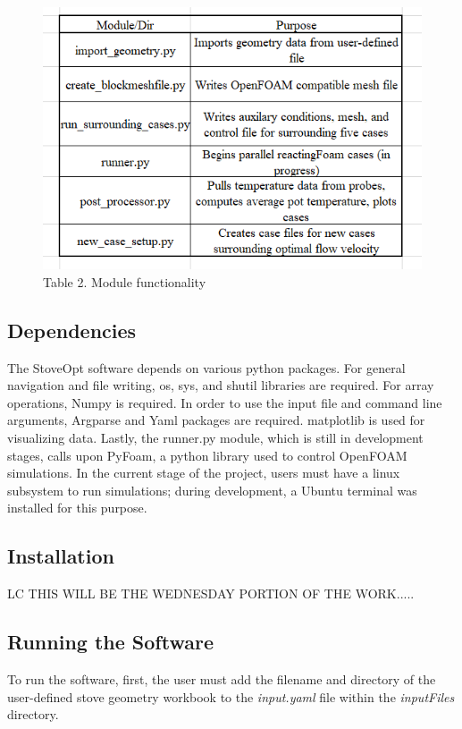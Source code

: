 \documentclass[3p,times,twocolumn]{elsarticle}
\begin{document}
\begin{figure}{\linewidth}
	\includegraphics[width=\linewidth]{functionality.PNG}
	\caption{Table 2. Module functionality}
\end{figure}


\subsection{Dependencies}
The StoveOpt software depends on various python packages. For general navigation and file writing, os, sys, and shutil libraries are required. For array operations, Numpy is required. In order to use the input file and command line arguments, Argparse and Yaml packages are required. matplotlib is used for visualizing data. Lastly, the runner.py module, which is still in development stages, calls upon PyFoam, a python library used to control OpenFOAM simulations. In the current stage of the project, users must have a linux subsystem to run simulations; during development, a Ubuntu terminal was installed for this purpose.

\subsection{Installation}

LC THIS WILL BE THE WEDNESDAY PORTION OF THE WORK.....

\subsection{Running the Software}
To run the software, first, the user must add the filename and directory of the user-defined stove geometry workbook to the \textit{input.yaml} file within the \textit{inputFiles} directory.
\end{document}
